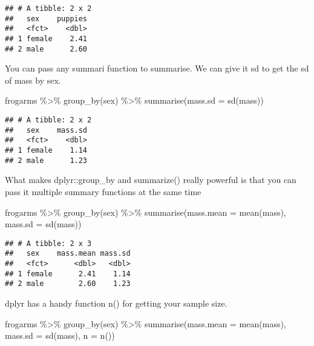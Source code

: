 \documentclass[
]{book}
\newenvironment{Shaded}{\begin{snugshade}}{\end{snugshade}}
\newcommand{\AttributeTok}[1]{\textcolor[rgb]{0.77,0.63,0.00}{#1}}
\newcommand{\FunctionTok}[1]{\textcolor[rgb]{0.00,0.00,0.00}{#1}}
\newcommand{\NormalTok}[1]{#1}
\newcommand{\SpecialCharTok}[1]{\textcolor[rgb]{0.00,0.00,0.00}{#1}}
\begin{document}
\begin{verbatim}
## # A tibble: 2 x 2
##   sex    puppies
##   <fct>    <dbl>
## 1 female    2.41
## 2 male      2.60
\end{verbatim}

You can pass any summari function to summarise. We can give it sd to get the sd of mass by sex.

\begin{Shaded}
\begin{Highlighting}[]
\NormalTok{frogarms }\SpecialCharTok{\%\textgreater{}\%} 
  \FunctionTok{group\_by}\NormalTok{(sex) }\SpecialCharTok{\%\textgreater{}\%}
  \FunctionTok{summarise}\NormalTok{(}\AttributeTok{mass.sd =} \FunctionTok{sd}\NormalTok{(mass))}
\end{Highlighting}
\end{Shaded}

\begin{verbatim}
## # A tibble: 2 x 2
##   sex    mass.sd
##   <fct>    <dbl>
## 1 female    1.14
## 2 male      1.23
\end{verbatim}

What makes dplyr::group\_by and summarize() really powerful is that you can pass it multiple summary functions at the same time

\begin{Shaded}
\begin{Highlighting}[]
\NormalTok{frogarms }\SpecialCharTok{\%\textgreater{}\%} 
  \FunctionTok{group\_by}\NormalTok{(sex) }\SpecialCharTok{\%\textgreater{}\%}
  \FunctionTok{summarise}\NormalTok{(}\AttributeTok{mass.mean =} \FunctionTok{mean}\NormalTok{(mass),}
            \AttributeTok{mass.sd =} \FunctionTok{sd}\NormalTok{(mass))}
\end{Highlighting}
\end{Shaded}

\begin{verbatim}
## # A tibble: 2 x 3
##   sex    mass.mean mass.sd
##   <fct>      <dbl>   <dbl>
## 1 female      2.41    1.14
## 2 male        2.60    1.23
\end{verbatim}

dplyr has a handy function n() for getting your sample size.

\begin{Shaded}
\begin{Highlighting}[]
\NormalTok{frogarms }\SpecialCharTok{\%\textgreater{}\%} 
  \FunctionTok{group\_by}\NormalTok{(sex) }\SpecialCharTok{\%\textgreater{}\%}
  \FunctionTok{summarise}\NormalTok{(}\AttributeTok{mass.mean =} \FunctionTok{mean}\NormalTok{(mass),}
            \AttributeTok{mass.sd =} \FunctionTok{sd}\NormalTok{(mass),}
            \AttributeTok{n =} \FunctionTok{n}\NormalTok{())}
\end{Highlighting}
\end{Shaded}
\end{document}
